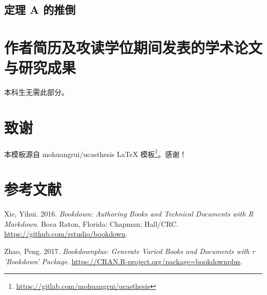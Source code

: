 \documentclass[doublesided]{Style/ucasthesis}%
\begin{document}
\hypertarget{ux5b9aux7406-a-ux7684ux63a8ux5012}{%
\section{定理 A 的推倒}\label{ux5b9aux7406-a-ux7684ux63a8ux5012}}

\flushbottom

\backmatter

\hypertarget{ux4f5cux8005ux7b80ux5386ux53caux653bux8bfbux5b66ux4f4dux671fux95f4ux53d1ux8868ux7684ux5b66ux672fux8bbaux6587ux4e0eux7814ux7a76ux6210ux679c}{%
\chapter{作者简历及攻读学位期间发表的学术论文与研究成果}\label{ux4f5cux8005ux7b80ux5386ux53caux653bux8bfbux5b66ux4f4dux671fux95f4ux53d1ux8868ux7684ux5b66ux672fux8bbaux6587ux4e0eux7814ux7a76ux6210ux679c}}

本科生无需此部分。

\hypertarget{ux81f4ux8c22}{%
\chapter{致谢}\label{ux81f4ux8c22}}

本模板源自 mohuangrui/ucasthesis \LaTeX{} 模板\footnote{\url{https://gitlab.com/mohuangrui/ucasthesis}}。感谢！

\hypertarget{ux53c2ux8003ux6587ux732e}{%
\chapter{参考文献}\label{ux53c2ux8003ux6587ux732e}}



\hypertarget{refs}{}
\begin{CSLReferences}{1}{0}
\leavevmode{}%
Xie, Yihui. 2016. \emph{Bookdown: Authoring Books and Technical Documents with {R} Markdown}. Boca Raton, Florida: Chapman; Hall/CRC. \url{https://github.com/rstudio/bookdown}.

\leavevmode{}%
Zhao, Peng. 2017. \emph{Bookdownplus: Generate Varied Books and Documents with r 'Bookdown' Package}. \url{https://CRAN.R-project.org/package=bookdownplus}.

\end{CSLReferences}
\end{document}
